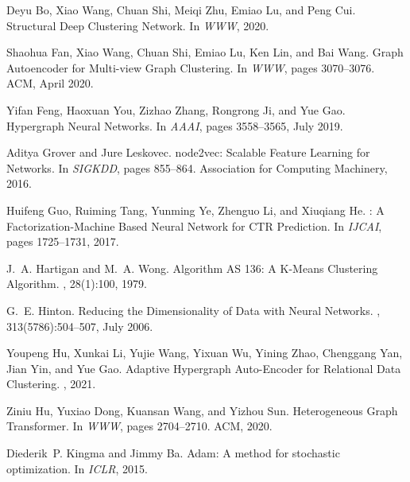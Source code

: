 \documentclass[11pt]{article}
\begin{document}
%
%

\begin{thebibliography}{10}

Deyu Bo, Xiao Wang, Chuan Shi, Meiqi Zhu, Emiao Lu, and Peng Cui.
\newblock Structural {Deep} {Clustering} {Network}.
\newblock In {\em WWW}, 2020.

Shaohua Fan, Xiao Wang, Chuan Shi, Emiao Lu, Ken Lin, and Bai Wang.
 {Graph} {Autoencoder} for {Multi}-view {Graph}
  {Clustering}.
\newblock In {\em WWW}, pages 3070--3076. ACM, April 2020.

Yifan Feng, Haoxuan You, Zizhao Zhang, Rongrong Ji, and Yue Gao.
\newblock Hypergraph {Neural} {Networks}.
\newblock In {\em AAAI}, pages 3558--3565, July 2019.

Aditya Grover and Jure Leskovec.
\newblock node2vec: {Scalable} {Feature} {Learning} for {Networks}.
\newblock In {\em {SIGKDD}}, pages 855--864. Association for Computing
  Machinery, 2016.

Huifeng Guo, Ruiming Tang, Yunming Ye, Zhenguo Li, and Xiuqiang He.
: {A} {Factorization}-{Machine} {Based} {Neural} {Network}
  for {CTR} {Prediction}.
\newblock In {\em IJCAI}, pages 1725--1731, 2017.

J.~A. Hartigan and M.~A. Wong.
\newblock Algorithm {AS} 136: {A} {K}-{Means} {Clustering} {Algorithm}.
, 28(1):100, 1979.

G.~E. Hinton.
\newblock Reducing the {Dimensionality} of {Data} with {Neural} {Networks}.
, 313(5786):504--507, July 2006.

Youpeng Hu, Xunkai Li, Yujie Wang, Yixuan Wu, Yining Zhao, Chenggang Yan, Jian
  Yin, and Yue Gao.
\newblock Adaptive {Hypergraph} {Auto}-{Encoder} for {Relational} {Data}
  {Clustering}.
, 2021.

Ziniu Hu, Yuxiao Dong, Kuansan Wang, and Yizhou Sun.
\newblock Heterogeneous {Graph} {Transformer}.
\newblock In {\em WWW}, pages 2704--2710. ACM, 2020.

Diederik~P. Kingma and Jimmy Ba.
\newblock Adam: {A} method for stochastic optimization.
\newblock In {\em ICLR}, 2015.


\end{thebibliography}
\end{document}
